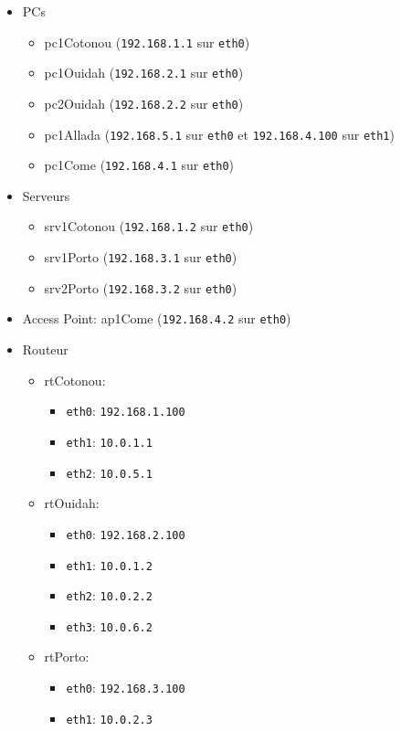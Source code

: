 \begin{itemize}
\item PCs
\begin{itemize}
\item pc1Cotonou (\texttt{192.168.1.1} sur \texttt{eth0})
\item pc1Ouidah (\texttt{192.168.2.1} sur \texttt{eth0})
\item pc2Ouidah (\texttt{192.168.2.2} sur \texttt{eth0}) 
\item pc1Allada (\texttt{192.168.5.1} sur \texttt{eth0} et \texttt{192.168.4.100} sur \texttt{eth1})
\item pc1Come (\texttt{192.168.4.1} sur \texttt{eth0}) 
\end{itemize}
\item Serveurs
\begin{itemize}
\item srv1Cotonou (\texttt{192.168.1.2} sur \texttt{eth0})
\item srv1Porto (\texttt{192.168.3.1} sur \texttt{eth0}) 
\item srv2Porto (\texttt{192.168.3.2} sur \texttt{eth0})      
\end{itemize}
\item Access Point: ap1Come (\texttt{192.168.4.2} sur \texttt{eth0})
\item Routeur
\begin{itemize}
\item rtCotonou:
\begin{itemize}
\item \texttt{eth0}: \texttt{192.168.1.100}
\item \texttt{eth1}: \texttt{10.0.1.1}
\item \texttt{eth2}: \texttt{10.0.5.1}
\end{itemize}
\item rtOuidah:
\begin{itemize}
\item \texttt{eth0}: \texttt{192.168.2.100}
\item \texttt{eth1}: \texttt{10.0.1.2}
\item \texttt{eth2}: \texttt{10.0.2.2}
\item \texttt{eth3}: \texttt{10.0.6.2}
\end{itemize}
\item rtPorto:
\begin{itemize}
\item \texttt{eth0}: \texttt{192.168.3.100}
\item \texttt{eth1}: \texttt{10.0.2.3}

\end{itemize}
\end{itemize}
\end{itemize}
